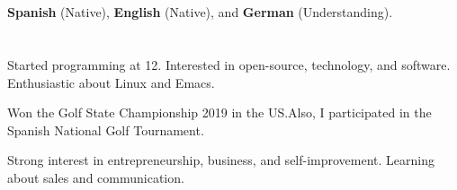 \documentclass[]{cv}
\begin{document}
\section{}

\textbf{Spanish} (Native), \textbf{English} (Native), and \textbf{German} (Understanding).


\section{}
\begin{tightemize}
	\item \dumblang%
	{Started programming at 12. Interested in open-source, technology, and software. Enthusiastic about Linux and Emacs.}
	{}
	\item \dumblang%
	{Won the Golf State Championship 2019 in the US.\@ Also, I participated in the Spanish National Golf Tournament.}
	{}
	\item \dumblang%
	{Strong interest in entrepreneurship, business, and self-improvement. Learning about sales and communication.}
	{}
\end{tightemize}
\end{document}
